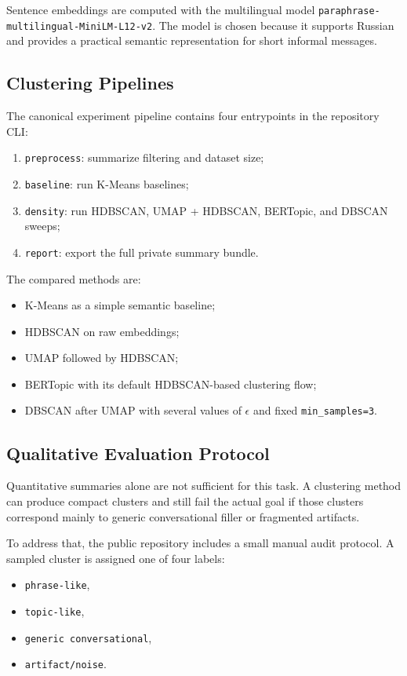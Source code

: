 \documentclass{bmvc2k}
\begin{document}
Sentence embeddings are computed with the multilingual model \texttt{paraphrase-multilingual-MiniLM-L12-v2}. The model is chosen because it supports Russian and provides a practical semantic representation for short informal messages.

\subsection{Clustering Pipelines}

The canonical experiment pipeline contains four entrypoints in the repository CLI:
\begin{enumerate}
    \item \texttt{preprocess}: summarize filtering and dataset size;
    \item \texttt{baseline}: run K-Means baselines;
    \item \texttt{density}: run HDBSCAN, UMAP + HDBSCAN, BERTopic, and DBSCAN sweeps;
    \item \texttt{report}: export the full private summary bundle.
\end{enumerate}

The compared methods are:
\begin{itemize}
    \item K-Means as a simple semantic baseline;
    \item HDBSCAN on raw embeddings;
    \item UMAP followed by HDBSCAN;
    \item BERTopic with its default HDBSCAN-based clustering flow;
    \item DBSCAN after UMAP with several values of $\epsilon$ and fixed \texttt{min\_samples=3}.
\end{itemize}

\subsection{Qualitative Evaluation Protocol}

Quantitative summaries alone are not sufficient for this task. A clustering method can produce compact clusters and still fail the actual goal if those clusters correspond mainly to generic conversational filler or fragmented artifacts.

To address that, the public repository includes a small manual audit protocol. A sampled cluster is assigned one of four labels:
\begin{itemize}
    \item \texttt{phrase-like},
    \item \texttt{topic-like},
    \item \texttt{generic conversational},
    \item \texttt{artifact/noise}.
\end{itemize}
\end{document}
